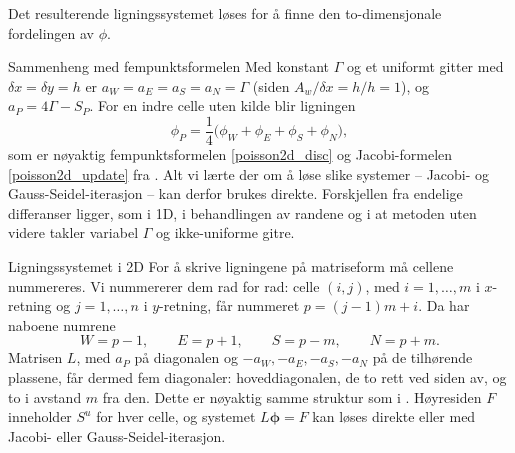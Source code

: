 Det resulterende ligningssystemet løses for å finne den to-dimensjonale fordelingen av $\phi$. 

\begin{rem}{Sammenheng med fempunktsformelen}
Med konstant $\Gamma$ og et uniformt gitter med $\delta x=\delta y=h$ er $a_W=a_E=a_S=a_N=\Gamma$ (siden $A_w/\delta x = h/h = 1$), og $a_P = 4\Gamma - S_P$. For en indre celle uten kilde blir ligningen
\[
\phi_P = \frac14\big(\phi_W+\phi_E+\phi_S+\phi_N\big),
\]
som er nøyaktig fempunktsformelen \eqref{poisson2d_disc} og Jacobi-formelen \eqref{poisson2d_update} fra . Alt vi lærte der om å løse slike systemer -- Jacobi- og Gauss-Seidel-iterasjon -- kan derfor brukes direkte. Forskjellen fra endelige differanser ligger, som i 1D, i behandlingen av randene og i at metoden uten videre takler variabel $\Gamma$ og ikke-uniforme gitre.
\end{rem}

\begin{rem}{Ligningssystemet i 2D}
For å skrive ligningene på matriseform må cellene nummereres. Vi nummererer dem rad for rad: celle $(i,j)$, med $i=1,\ldots,m$ i $x$-retning og $j=1,\ldots,n$ i $y$-retning, får nummeret $p=(j-1)m+i$. Da har naboene numrene
\[
W = p-1, \qquad E = p+1, \qquad S = p-m, \qquad N = p+m .
\]
Matrisen $L$, med $a_P$ på diagonalen og $-a_W,-a_E,-a_S,-a_N$ på de tilhørende plassene, får dermed fem diagonaler: hoveddiagonalen, de to rett ved siden av, og to i avstand $m$ fra den. Dette er nøyaktig samme struktur som i . Høyresiden $F$ inneholder $S^u$ for hver celle, og systemet $L\boldsymbol{\phi}=F$ kan løses direkte eller med Jacobi- eller Gauss-Seidel-iterasjon.
\end{rem}

